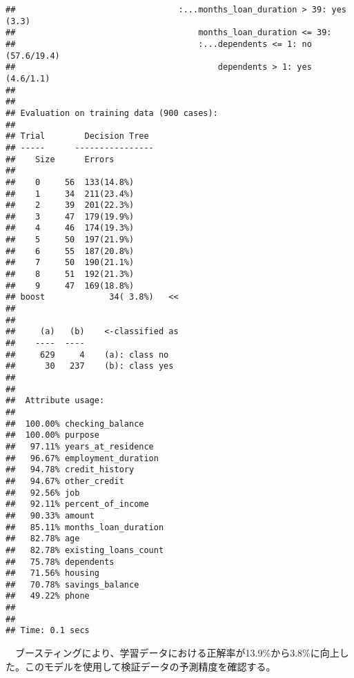 \documentclass[
]{article}
\newenvironment{Shaded}{\begin{snugshade}}{\end{snugshade}}
\newcommand{\AttributeTok}[1]{\textcolor[rgb]{0.13,0.29,0.53}{#1}}
\newcommand{\ConstantTok}[1]{\textcolor[rgb]{0.56,0.35,0.01}{#1}}
\newcommand{\FunctionTok}[1]{\textcolor[rgb]{0.13,0.29,0.53}{\textbf{#1}}}
\newcommand{\NormalTok}[1]{#1}
\newcommand{\OtherTok}[1]{\textcolor[rgb]{0.56,0.35,0.01}{#1}}
\newcommand{\SpecialCharTok}[1]{\textcolor[rgb]{0.81,0.36,0.00}{\textbf{#1}}}
\newcommand{\StringTok}[1]{\textcolor[rgb]{0.31,0.60,0.02}{#1}}
\begin{document}
\begin{verbatim}
##                                 :...months_loan_duration > 39: yes (3.3)
##                                     months_loan_duration <= 39:
##                                     :...dependents <= 1: no (57.6/19.4)
##                                         dependents > 1: yes (4.6/1.1)
## 
## 
## Evaluation on training data (900 cases):
## 
## Trial        Decision Tree   
## -----      ----------------  
##    Size      Errors  
## 
##    0     56  133(14.8%)
##    1     34  211(23.4%)
##    2     39  201(22.3%)
##    3     47  179(19.9%)
##    4     46  174(19.3%)
##    5     50  197(21.9%)
##    6     55  187(20.8%)
##    7     50  190(21.1%)
##    8     51  192(21.3%)
##    9     47  169(18.8%)
## boost             34( 3.8%)   <<
## 
## 
##     (a)   (b)    <-classified as
##    ----  ----
##     629     4    (a): class no
##      30   237    (b): class yes
## 
## 
##  Attribute usage:
## 
##  100.00% checking_balance
##  100.00% purpose
##   97.11% years_at_residence
##   96.67% employment_duration
##   94.78% credit_history
##   94.67% other_credit
##   92.56% job
##   92.11% percent_of_income
##   90.33% amount
##   85.11% months_loan_duration
##   82.78% age
##   82.78% existing_loans_count
##   75.78% dependents
##   71.56% housing
##   70.78% savings_balance
##   49.22% phone
## 
## 
## Time: 0.1 secs
\end{verbatim}

　ブースティングにより、学習データにおける正解率が13.9\%から3.8\%に向上した。このモデルを使用して検証データの予測精度を確認する。

\begin{Shaded}
\end{Shaded}
\end{document}
